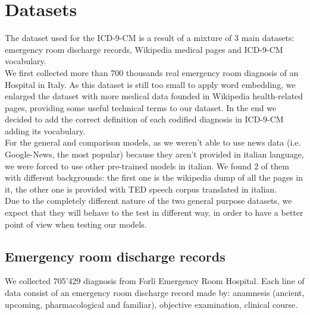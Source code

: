 \chapter{Datasets}
The dataset used for the ICD-9-CM is a result of a mixture of 3 main datasets: emergency room discharge records, Wikipedia medical pages and ICD-9-CM vocabulary.\\
We first collected more than 700 thousands real emergency room diagnosis of an Hospital in Italy. As this dataset is still too small to apply word embedding, we enlarged the dataset with more medical data founded in Wikipedia health-related pages, providing some useful technical terms to our dataset. In the end we decided to add the correct definition of each codified diagnosis in ICD-9-CM adding its vocabulary.\\
For the general and comparison models, as we weren't able to use news data (i.e. Google-News, the most popular) because they aren't provided in italian language, we were forced to use other pre-trained models in italian. We found 2 of them with different backgrounds: the first one is the wikipedia dump of all the pages in it, the other one is provided with TED speech corpus translated in italian.\\
Due to the completely different nature of the two general purpose datasets, we expect that they will behave to the test in different way, in order to have a better point of view when testing our models.

\section{Emergency room discharge records}

We collected 705'429 diagnosis from Forlì Emergency Room Hospital. Each line of data consist of an emergency room discharge record made by: anamnesis (ancient, upcoming, pharmacological and familiar), objective examination, clinical course.

